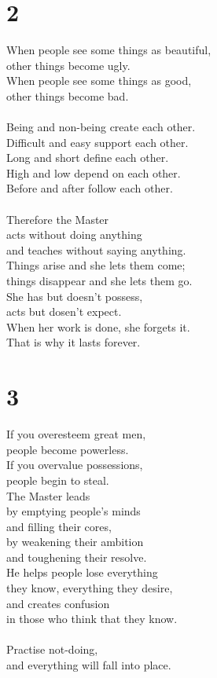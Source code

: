 \documentclass[b5paper, 12pt, oneside]{book}
\begin{document}
\chapter*{2}
When people see some things as beautiful,\\
other things become ugly.\\
When people see some things as good,\\
other things become bad.\\
\\
Being and non-being create each other.\\
Difficult and easy support each other.\\
Long and short define each other.\\
High and low depend on each other.\\
Before and after follow each other.\\
\\
Therefore the Master\\
acts without doing anything\\
and teaches without saying anything.\\
Things arise and she lets them come;\\
things disappear and she lets them go.\\
She has but doesn't possess,\\
acts but dosen't expect.\\
When her work is done, she forgets it.\\
That is why it lasts forever.\\

\chapter*{3}
If you overesteem great men,\\
people become powerless.\\
If you overvalue possessions,\\
people begin to steal.\\
The Master leads\\
by emptying people's minds\\
and filling their cores,\\
by weakening their ambition\\
and toughening their resolve.\\
He helps people lose everything\\
they know, everything they desire,\\
and creates confusion\\
in those who think that they know.\\
\\
Practise not-doing,\\
and everything will fall into place.\\
\end{document}
